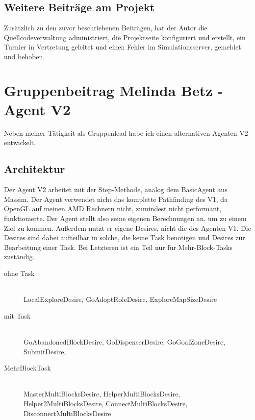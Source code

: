 \documentclass[runningheads]{llncs}
\begin{document}
	
	\subsection{Weitere Beiträge am Projekt}\label{weitereBeitraege}
	Zusätzlich zu den zuvor beschriebenen Beiträgen, hat der Autor die Quellcodeverwaltung \cite{Github} administriert, die Projektseite \cite{Site} konfiguriert und erstellt, ein Turnier in Vertretung geleitet und einen Fehler im Simulationsserver, gemeldet \cite{Bug} und behoben.
	
	
	\section{Gruppenbeitrag Melinda Betz - Agent V2}
	Neben meiner Tätigkeit als Gruppenlead habe ich einen alternativen Agenten V2 entwickelt.
	
	\subsection{ Architektur}
	Der Agent V2 arbeitet mit der Step-Methode, analog dem BasicAgent aus Massim. 
	Der Agent verwendet nicht das komplette Pathfinding des V1, da OpenGL auf meinen AMD Rechnern nicht, zumindest nicht performant, funktionierte. Der Agent stellt also seine eigenen Berechnungen an, um zu einem Ziel zu kommen. Außerdem nutzt er eigene Desires, nicht die des Agenten V1. Die Desires sind dabei aufteilbar in solche, die keine Task benötigen und Desires zur Bearbeitung einer Task. Bei Letzteren ist ein Teil nur für Mehr-Block-Tasks zuständig.
	
	\begin{description}
		\item[ohne Task]\hfill \\
		LocalExploreDesire,
		GoAdoptRoleDesire, 
		ExploreMapSizeDesire
	\end{description}
	
	\begin{description}
		\item[mit Task]\hfill \\
		GoAbandonedBlockDesire,
		GoDispenserDesire,
		GoGoalZoneDesire,
		SubmitDesire,
	\end{description}
	
	\begin{description}
		\item[Mehr\-Block\-Task]\hfill \\
		MasterMultiBlocksDesire,
		HelperMultiBlocksDesire,
		Helper2MultiBlocksDesire,
		ConnectMultiBlocksDesire,
		DisconnectMultiBlocksDesire
	\end{description}
\end{document}
